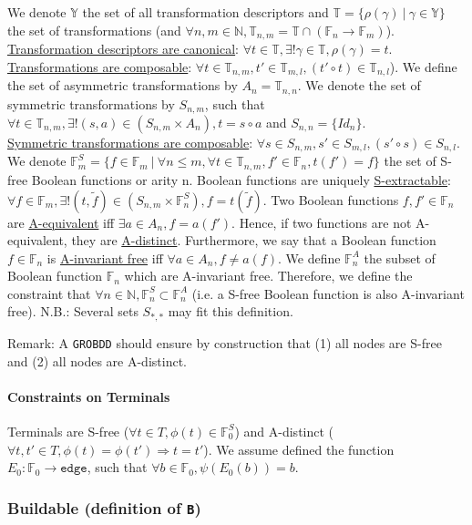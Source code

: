 \documentclass[a4paper,10pt]{article}
\newcommand{\N}{\mathbb{N}}%
\newcommand{\F}{\mathbb{F}}
\newcommand{\Y}{\mathbb{Y}}
\newcommand{\T}{\mathbb{T}}
\newcommand{\GroBdd}{\texttt{GROBDD}}
\begin{document}
We denote $\Y$ the set of all transformation descriptors and $\T=\{\rho(\gamma)~|~\gamma\in\Y\}$ the set of transformations (and $\forall n, m\in\N, \T_{n, m} = \T \cap (\F_n \longrightarrow \F_m)$).
\underline{Transformation descriptors are canonical}: $\forall t\in\T, \exists! \gamma\in\T, \rho(\gamma)=t$.\\
\underline{Transformations are composable}: $\forall t\in\T_{n, m}, t'\in\T_{m ,l}, (t' \circ t) \in \T_{n, l}$).
We define the set of asymmetric transformations by $A_n = \T_{n, n}$.
We denote the set of symmetric transformations by $S_{n, m}$, such that $\forall t\in\T_{n, m}, \exists!(s, a)\in(S_{n, m}\times A_n), t = s \circ a$ and $S_{n, n} = \{Id_n\}$.\\
\underline{Symmetric transformations are composable}: $\forall s\in S_{n, m}, s'\in S_{m ,l}, (s' \circ s) \in S_{n, l}$.
We denote $\F^S_m = \{f\in\F_m~|~\forall n \leq m, \forall t\in\T_{n, m}, f'\in\F_n, t(f') = f\}$ the set of S-free Boolean functions or arity n.
Boolean functions are uniquely \underline{S-extractable}: $\forall f\in\F_m, \exists! (t, \tilde{f})\in \left( S_{n, m} \times \F^S_n \right), f = t(\tilde{f})$.
Two Boolean functions $f, f'\in\F_n$ are \underline{A-equivalent} iff $\exists a\in A_n, f=a(f')$.
Hence, if two functions are not A-equivalent, they are \underline{A-distinct}.
Furthermore, we say that a Boolean function $f\in\F_n$ is \underline{A-invariant free} iff $\forall a\in A_n, f\neq a(f)$.
We define $\F^A_n$ the subset of Boolean function $\F_n$ which are A-invariant free.
Therefore, we define the constraint that $\forall n\in\N, \F^S_n \subset \F^A_n$ (i.e. a S-free Boolean function is also A-invariant free).
N.B.: Several sets $S_{*, *}$ may fit this definition.

Remark: A \GroBdd{} should ensure by construction that (1) all nodes are S-free and (2) all nodes are A-distinct.

\paragraph{Constraints on Terminals}
Terminals are S-free ($\forall t\in T, \phi(t)\in\F^S_0$) and A-distinct ($\forall t, t'\in T, \phi(t) = \phi(t') \Rightarrow t = t'$).
We assume defined the function $E_0 : \F_0 \longrightarrow \mathtt{edge}$, such that $\forall b\in\F_0, \psi(E_0(b)) = b$. 


\subsubsection{Buildable (definition of \texttt{B})}
\end{document}
